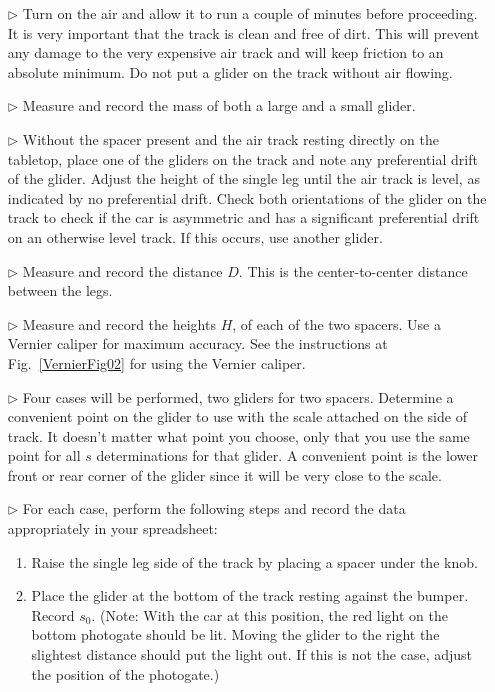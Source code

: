 \begin{itemize}
\item[$\triangleright$] Turn on the air and allow it to run a couple of minutes before proceeding.  It is very important that the track is clean and free of dirt.  This will prevent any damage to the very expensive air track and will keep friction to an absolute minimum.  Do not put a glider on the track without air flowing.
\item[$\triangleright$] Measure and record the mass of both a large and a small glider.
\item[$\triangleright$] Without the spacer present and the air track resting directly on the tabletop, place one of the gliders on the track and note any preferential drift of the glider.  Adjust the height of the single leg until the air track is level, as indicated by no preferential drift.  Check both orientations of the glider on the track to check if the car is asymmetric and has a significant preferential drift on an otherwise level track.  If this occurs, use another glider.
\item[$\triangleright$] Measure and record the distance $D$.  This is the center-to-center distance between the legs.
\item[$\triangleright$] Measure and record the heights $H$, of each of the two spacers.  Use a Vernier caliper for maximum accuracy. See the instructions at Fig.~\ref{VernierFig02} for using the Vernier caliper.
\item[$\triangleright$] Four cases will be performed, two gliders for two spacers.  Determine a convenient point on the glider to use with the scale attached on the side of track.  It doesn't matter what point you choose, only that you use the same point for all $s$ determinations for that glider.  A convenient point is the lower front or rear corner of the glider since it will be very close to the scale.
\item[$\triangleright$] For each case, perform the following steps and record the data appropriately in your spreadsheet:
  \begin{enumerate}
  \item Raise the single leg side of the track by placing a spacer under the knob.
  \item Place the glider at the bottom of the track resting against the bumper. Record $s_0$. (Note: With the car at this position, the red light on the bottom photogate should be lit. Moving the glider to the right the slightest distance should put the light out. If this is not the case, adjust the position of the photogate.)

\end{enumerate}
\end{itemize}

